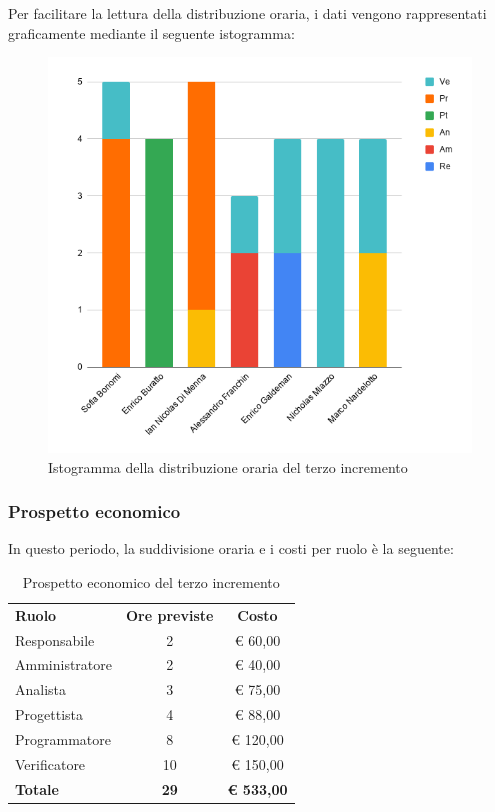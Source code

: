 \documentclass[../piano-di-progetto.tex]{subfiles}
\begin{document}
  Per facilitare la lettura della distribuzione oraria, i dati vengono rappresentati graficamente mediante il seguente istogramma:
  \begin{figure}[H]
    \centering
    \includegraphics[width=12cm]{img/ore-3-incr.png}
    \caption{Istogramma della distribuzione oraria del terzo incremento}
    \label{fig:ore-componente-progettazione}
  \end{figure}

  \subsubsection{Prospetto economico}
  In questo periodo, la suddivisione oraria e i costi per ruolo è la seguente:

  \begin{table}[H]
    \centering
    \begin{tabular}{lcc}
      \rowcolor{lightgray}
      \textbf{Ruolo}  & \textbf{Ore previste} & \textbf{Costo}    \\
Responsabile    & 2                     & € 60,00           \\
Amministratore  & 2                     & € 40,00           \\
Analista        & 3                     & € 75,00           \\
Progettista     & 4                     & € 88,00           \\
Programmatore   & 8                     & € 120,00          \\
Verificatore    & 10                    & € 150,00          \\
\textbf{Totale} & \textbf{29}           & \textbf{€ 533,00}
    \end{tabular}
    \caption{Prospetto economico del terzo incremento}
  \end{table}
\end{document}
